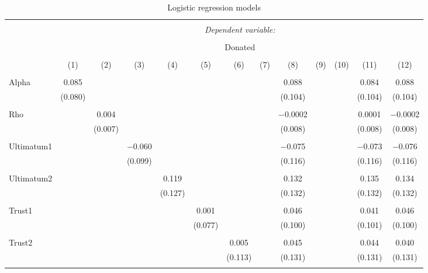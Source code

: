 \begin{table}[H] \centering 
  \caption{Logistic regression models} 
  \label{} 
  \begin{adjustbox}{width=\textwidth}
  \begin{tabular}{@{\extracolsep{5pt}}lcccccccccccc} 
\\[-1.8ex]\hline 
\hline \\[-1.8ex] 
 & \multicolumn{12}{c}{\textit{Dependent variable:}} \\ 
\cline{2-13} 
\\[-1.8ex] & \multicolumn{12}{c}{Donated} \\ 
\\[-1.8ex] & (1) & (2) & (3) & (4) & (5) & (6) & (7) & (8) & (9) & (10) & (11) & (12)\\ 
\hline \\[-1.8ex] 
 Alpha & 0.085 &  &  &  &  &  &  & 0.088 &  &  & 0.084 & 0.088 \\ 
  & (0.080) &  &  &  &  &  &  & (0.104) &  &  & (0.104) & (0.104) \\ 
  & & & & & & & & & & & & \\ 
 Rho &  & 0.004 &  &  &  &  &  & $-$0.0002 &  &  & 0.0001 & $-$0.0002 \\ 
  &  & (0.007) &  &  &  &  &  & (0.008) &  &  & (0.008) & (0.008) \\ 
  & & & & & & & & & & & & \\ 
 Ultimatum1 &  &  & $-$0.060 &  &  &  &  & $-$0.075 &  &  & $-$0.073 & $-$0.076 \\ 
  &  &  & (0.099) &  &  &  &  & (0.116) &  &  & (0.116) & (0.116) \\ 
  & & & & & & & & & & & & \\ 
 Ultimatum2 &  &  &  & 0.119 &  &  &  & 0.132 &  &  & 0.135 & 0.134 \\ 
  &  &  &  & (0.127) &  &  &  & (0.132) &  &  & (0.132) & (0.132) \\ 
  & & & & & & & & & & & & \\ 
 Trust1 &  &  &  &  & 0.001 &  &  & 0.046 &  &  & 0.041 & 0.046 \\ 
  &  &  &  &  & (0.077) &  &  & (0.100) &  &  & (0.101) & (0.100) \\ 
  & & & & & & & & & & & & \\ 
 Trust2 &  &  &  &  &  & 0.005 &  & 0.045 &  &  & 0.044 & 0.040 \\ 
  &  &  &  &  &  & (0.113) &  & (0.131) &  &  & (0.131) & (0.131) \\ 
  & & & & & & & & & & & & \\ 

\end{tabular}
\end{adjustbox}
\end{table}
